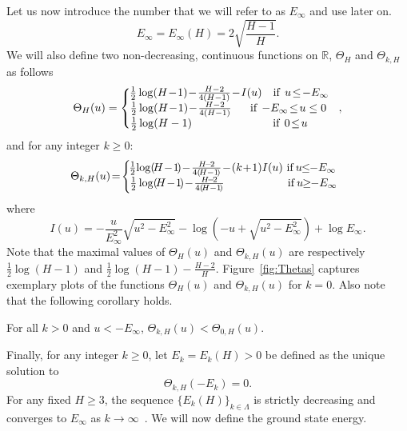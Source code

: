 \documentclass[twoside]{article}
\begin{document}
Let us now introduce the number that we will refer to as $E_{\infty}$ and use later on.
\begin{equation}
E_{\infty} = E_{\infty}(H) = 2\sqrt{\frac{H-1}{H}}.
\label{eq:E_inf}
\end{equation}
We will also define two non-decreasing, continuous functions on $\mathbb{R}$, $\Theta_H$ and $\Theta_{k,H}$ as follows
\[\Theta_H(u) = \left \{
  \begin{tabular}{c}
  $\!\!\!\!\frac{1}{2}\log(H\!-\!1) \!-\! \frac{H-2}{4(H-1)} \!-\! I(u)$ $\:\:\:$if$\:\:$$u \!\leq\! -E_{\infty}$\\
  $\!\!\!\!\!\frac{1}{2}\log(H\!-\!1) \!-\! \frac{H-2}{4(H-1)}$ $\:\:\:\:\:\:$if$\:\:$$-E_{\infty} \!\leq\! u \leq 0$\\
  $\!\!\!\!\!\!\!\!\!\!\!\!\!\!\!\frac{1}{2}\log(H-1)$ $\:\:\:\:\:\:\:\:\:\:\:\:\:\:\:\:\:\:\:\:\:\:\:\:\:\:\:\:\:\:\:$if$\:\:$$0 \!\leq\! u$
  \end{tabular}
\right.,
\]
and for any integer $k \geq 0$:
\[\Theta_{k,H}(u) \!=\! \left \{
  \begin{tabular}{c}
  $\!\!\!\!\!\frac{1}{2}\!\log(\!H\!-\!1\!) \!-\! \frac{H\!-\!2}{4(\!H-1\!)} \!-\! (k\!+\!1)I(u)$ if$\:$$u \!\!\leq\!\! -E_{\infty}$\\
  $\!\!\!\!\frac{1}{2}\log(\!H\!-\!1\!) \!-\! \frac{H\!-\!2}{4(\!H-1\!)}$ $\:\:\:\:\:\:\:\:\:\:\:\:\:\:\:\:\:\:\:\:\:\:\:\:$if$\:$$u \!\!\geq\!\! -E_{\infty}$
  \end{tabular}
\right.
\]
where 
\[I(u) = -\frac{u}{E_{\infty}^2}\sqrt{u^2 - E_{\infty}^2} - \log(-u + \sqrt{u^2 - E_{\infty}^2}) + \log E_{\infty}.
\]
Note that the maximal values of $\Theta_H(u)$ and $\Theta_{k,H}(u)$ are respectively $\frac{1}{2}\log(H-1)$ and $\frac{1}{2}\log(H-1) - \frac{H-2}{H}$. Figure~\ref{fig:Thetas} captures exemplary plots of the functions $\Theta_H(u)$ and $\Theta_{k,H}(u)$ for $k = 0$. Also note that the following corollary holds.
\begin{corollary}
For all $k > 0$ and $u < -E_{\infty}$, $\Theta_{k,H}(u) < \Theta_{0,H}(u)$.
\label{cor:Theta}
\end{corollary}
Finally, for any integer $k \geq 0$, let $E_k = E_k(H) > 0 $ be defined as the unique solution to 
\[\Theta_{k,H}(-E_k) = 0.
\]
For any fixed $H \geq 3$, the sequence $\{E_k(H)\}_{k\in\mathbb{\Lambda}}$ is strictly decreasing and converges to $E_{\infty}$ as $k \rightarrow \infty$~\cite{AAC2010}. We will now define the ground state energy.
\end{document}

